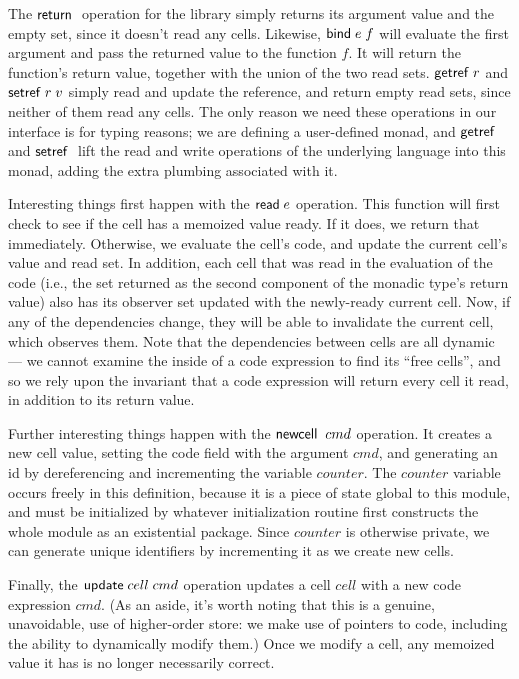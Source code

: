 The $\mathsf{return}\;$ operation for the library simply returns its argument
value and the empty set, since it doesn't read any cells. Likewise,
$\mathsf{bind}\; e\;f$ will evaluate the first argument and pass the returned
value to the function $f$. It will return the function's return value,
together with the union of the two read sets. $\mathsf{getref}\; r$ and $\mathsf{setref}\;
r\;v$ simply read and update the reference, and return empty read
sets, since neither of them read any cells. The only reason we need 
these operations in our interface is for typing reasons; we are defining
a user-defined monad, and $\mathsf{getref}\;$ and $\mathsf{setref}\;$ lift the read and
write operations of the underlying language into this monad, adding 
the extra plumbing associated with it.

Interesting things first happen with the $\mathsf{read}\; e$ operation. This
function will first check to see if the cell has a memoized value
ready. If it does, we return that immediately. Otherwise, we evaluate
the cell's code, and update the current cell's value and read set. In
addition, each cell that was read in the evaluation of the code (i.e.,
the set returned as the second component of the monadic type's return
value) also has its observer set updated with the newly-ready current
cell. Now, if any of the dependencies change, they will be able to
invalidate the current cell, which observes them. Note that the
dependencies between cells are all dynamic --- we cannot examine the
inside of a code expression to find its ``free cells'', and so we rely
upon the invariant that a code expression will return every cell it
read, in addition to its return value.

Further interesting things happen with the $\mathsf{newcell}\;\;cmd$
operation.  It creates a new cell value, setting the code field with
the argument $cmd$, and generating an id by dereferencing and
incrementing the variable $counter$. The $counter$ variable occurs
freely in this definition, because it is a piece of state global to
this module, and must be initialized by whatever initialization
routine first constructs the whole module as an existential package.
Since $counter$ is otherwise private, we can generate unique
identifiers by incrementing it as we create new cells. 

Finally, the $\mathsf{update}\;cell\;cmd$ operation updates a cell
$cell$ with a new code expression $cmd$. (As an aside, it's worth
noting that this is a genuine, unavoidable, use of higher-order store:
we make use of pointers to code, including the ability to dynamically
modify them.) Once we modify a cell, any memoized value it has is no
longer necessarily correct.

